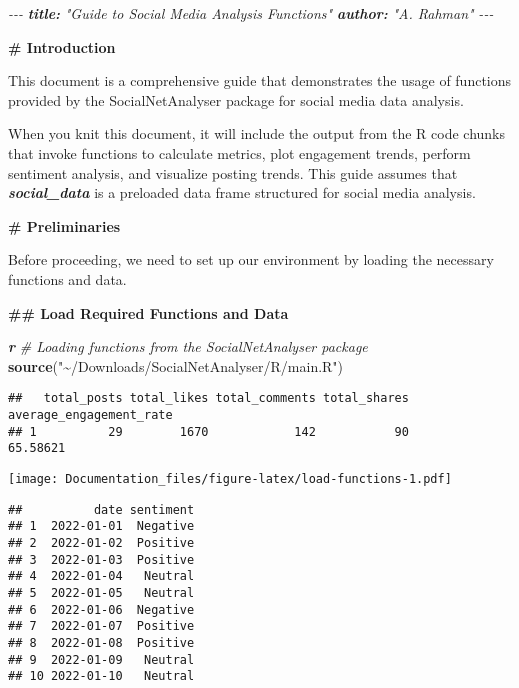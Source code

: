 \documentclass[
]{article}
\author{}
\date{\vspace{-2.5em}}
\newenvironment{Shaded}{\begin{snugshade}}{\end{snugshade}}
\newcommand{\AnnotationTok}[1]{\textcolor[rgb]{0.56,0.35,0.01}{\textbf{\textit{#1}}}}
\newcommand{\CommentTok}[1]{\textcolor[rgb]{0.56,0.35,0.01}{\textit{#1}}}
\newcommand{\FunctionTok}[1]{\textcolor[rgb]{0.13,0.29,0.53}{\textbf{#1}}}
\newcommand{\InformationTok}[1]{\textcolor[rgb]{0.56,0.35,0.01}{\textbf{\textit{#1}}}}
\newcommand{\NormalTok}[1]{#1}
\newcommand{\StringTok}[1]{\textcolor[rgb]{0.31,0.60,0.02}{#1}}
\begin{document}
\begin{Shaded}
\begin{Highlighting}[]
\CommentTok{{-}{-}{-}}
\AnnotationTok{title:}\CommentTok{ "Guide to Social Media Analysis Functions"}
\AnnotationTok{author:}\CommentTok{ "A. Rahman"}
\CommentTok{{-}{-}{-}}

\FunctionTok{\# Introduction}

\NormalTok{This document is a comprehensive guide that demonstrates the usage of functions provided by the SocialNetAnalyser package for social media data analysis.}

\NormalTok{When you knit this document, it will include the output from the R code chunks that invoke functions to calculate metrics, plot engagement trends, perform sentiment analysis, and visualize posting trends. This guide assumes that }\InformationTok{\textasciigrave{}social\_data\textasciigrave{}}\NormalTok{ is a preloaded data frame structured for social media analysis.}

\FunctionTok{\# Preliminaries}

\NormalTok{Before proceeding, we need to set up our environment by loading the necessary functions and data.}

\FunctionTok{\#\# Load Required Functions and Data}




\InformationTok{\textasciigrave{}\textasciigrave{}\textasciigrave{}r}
\CommentTok{\# Loading functions from the SocialNetAnalyser package}
\FunctionTok{source}\NormalTok{(}\StringTok{"\textasciitilde{}/Downloads/SocialNetAnalyser/R/main.R"}\NormalTok{)}
\end{Highlighting}
\end{Shaded}

\begin{verbatim}
##   total_posts total_likes total_comments total_shares average_engagement_rate
## 1          29        1670            142           90                65.58621
\end{verbatim}

\texttt{[image: Documentation\_files/figure-latex/load-functions-1.pdf]}

\begin{verbatim}
##          date sentiment
## 1  2022-01-01  Negative
## 2  2022-01-02  Positive
## 3  2022-01-03  Positive
## 4  2022-01-04   Neutral
## 5  2022-01-05   Neutral
## 6  2022-01-06  Negative
## 7  2022-01-07  Positive
## 8  2022-01-08  Positive
## 9  2022-01-09   Neutral
## 10 2022-01-10   Neutral
\end{verbatim}
\end{document}

